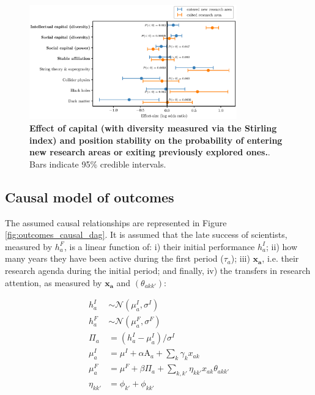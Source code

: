 \documentclass{article}
\begin{document}
\begin{figure}[H]
    \centering
    \includegraphics[width=0.8\textwidth]{plots/entered_score_effects_stirling.eps}
    \caption{\textbf{Effect of capital (with diversity measured via the Stirling index) and position stability on the probability of entering new research areas or exiting previously explored ones.}. Bars indicate 95\% credible intervals.}
    \label{fig:diversification_score_stirling}
\end{figure}



\subsection{\label{appendix:outcomes}Causal model of outcomes}

The assumed causal relationships are represented in Figure \ref{fig:outcomes_causal_dag}. It is assumed that the late success of scientists, measured by $h_a^{F}$, is a linear function of: i) their initial performance $h_a^{I}$; ii) how many years they have been active during the first period ($\tau_a$); iii) $\bm{x_a}$, i.e. their research agenda during the initial period; and finally, iv) the transfers in research attention, as measured by $\bm{x_a}$ and $(\theta_{akk'})$:

\begin{align}
    h_a^{I} &\sim \mathcal{N}(\mu_{a}^I,\sigma^I)\\
    h_a^{F} &\sim \mathcal{N}(\mu_{a}^F ,\sigma^F)\\
    \Pi_a &= (h_a^{I}-\mu_{a}^I)/\sigma^I \\
    \mu_{a}^I &= \mu^I + \alpha \text{A}_a + \sum_{k}\gamma_k x_{ak}\\
    \mu_{a}^F &= \mu^F  + \beta \Pi_a +\sum_{k,k'}\eta_{kk'}x_{ak}\theta_{akk'}\\
    \eta_{kk'} &= \phi_{k'}+\phi_{kk'}
\end{align}
\end{document}
